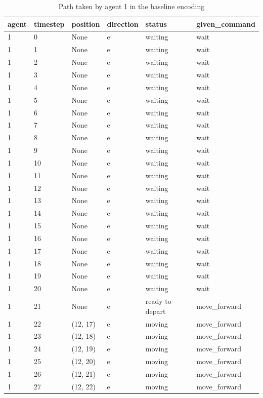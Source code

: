 \begin{table}[H]
  \centering
  \caption{Path taken by agent 1 in the baseline encoding}
  \label{tab:baseline1}
  \begin{tabular}{llllll}
    \toprule
    agent & timestep & position & direction & status & given\_command \\
    \midrule
1 & 0 & None & e & waiting & wait \\
1 & 1 & None & e & waiting & wait \\
1 & 2 & None & e & waiting & wait \\
1 & 3 & None & e & waiting & wait \\
1 & 4 & None & e & waiting & wait \\
1 & 5 & None & e & waiting & wait \\
1 & 6 & None & e & waiting & wait \\
1 & 7 & None & e & waiting & wait \\
1 & 8 & None & e & waiting & wait \\
1 & 9 & None & e & waiting & wait \\
1 & 10 & None & e & waiting & wait \\
1 & 11 & None & e & waiting & wait \\
1 & 12 & None & e & waiting & wait \\
1 & 13 & None & e & waiting & wait \\
1 & 14 & None & e & waiting & wait \\
1 & 15 & None & e & waiting & wait \\
1 & 16 & None & e & waiting & wait \\
1 & 17 & None & e & waiting & wait \\
1 & 18 & None & e & waiting & wait \\
1 & 19 & None & e & waiting & wait \\
1 & 20 & None & e & waiting & wait \\
1 & 21 & None & e & ready to depart & move\_forward \\
1 & 22 & (12, 17) & e & moving & move\_forward \\
1 & 23 & (12, 18) & e & moving & move\_forward \\
1 & 24 & (12, 19) & e & moving & move\_forward \\
1 & 25 & (12, 20) & e & moving & move\_forward \\
1 & 26 & (12, 21) & e & moving & move\_forward \\
1 & 27 & (12, 22) & e & moving & move\_forward \\

\end{tabular}
\end{table}
